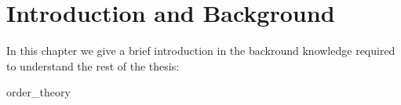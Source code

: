 \chapter{Introduction and Background}

In this chapter we give a brief introduction in the backround knowledge
required to understand the rest of the thesis:

{order_theory}
